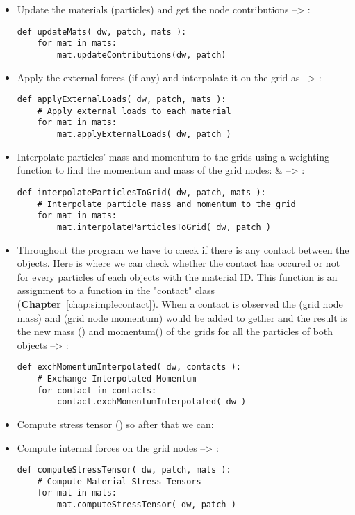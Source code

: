 \begin{itemize}
\item Update the materials (particles) and get the node contributions --> :
\begin{lstlisting}
def updateMats( dw, patch, mats ):
    for mat in mats:
        mat.updateContributions(dw, patch)
\end{lstlisting}
\item Apply the external forces (if any) and interpolate it on the grid as  --> :
\begin{lstlisting}
def applyExternalLoads( dw, patch, mats ):
    # Apply external loads to each material
    for mat in mats:
        mat.applyExternalLoads( dw, patch )
\end{lstlisting}
\item Interpolate particles' mass and momentum to the grids using a weighting function to find the momentum and mass of the grid nodes:  \&  --> :
\begin{lstlisting}
def interpolateParticlesToGrid( dw, patch, mats ):
    # Interpolate particle mass and momentum to the grid
    for mat in mats:
        mat.interpolateParticlesToGrid( dw, patch ) 
\end{lstlisting}
\item Throughout the program we have to check if there is any contact between the objects. Here is where we can check whether the contact has occured or not for every particles of each objects with the material ID. This function is an assignment to a function in the "contact" class (\textbf{Chapter}~\ref{chap:simplecontact}). When a contact is observed the  (grid node mass) and  (grid node momentum) would be added to gether and the result is the new mass () and momentum() of the grids for all the particles of both objects --> :
\begin{lstlisting}
def exchMomentumInterpolated( dw, contacts ):
    # Exchange Interpolated Momentum
    for contact in contacts:
        contact.exchMomentumInterpolated( dw )
\end{lstlisting}
\item Compute stress tensor () so after that we can:
\item Compute internal forces on the grid nodes --> :
\begin{lstlisting}
def computeStressTensor( dw, patch, mats ):
    # Compute Material Stress Tensors
    for mat in mats:
        mat.computeStressTensor( dw, patch )


\end{lstlisting}
\end{itemize}
